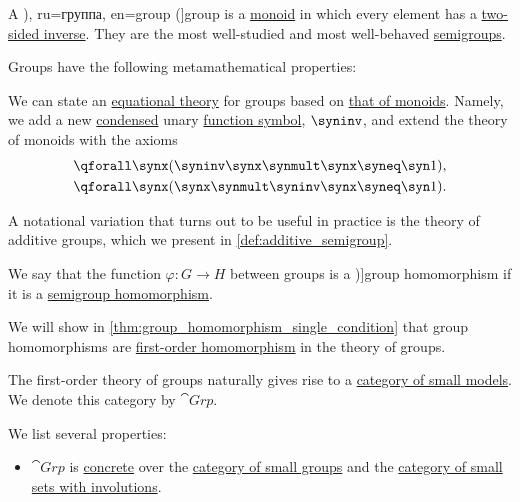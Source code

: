 \begin{definition}\label{def:group}
  A \term[bg=група (\cite[372]{Обрешков1962ВисшаАлгебра}), ru=группа, en=group (\cite[def. 1.2]{Jacobson1985BasicAlgebraI}]{group} is a \hyperref[def:monoid]{monoid} in which every element has a \hyperref[def:monoid_inverse]{two-sided inverse}. They are the most well-studied and most well-behaved \hyperref[def:semigroup]{semigroups}.

  Groups have the following metamathematical properties:
  \begin{thmenum}
     We can state an \hyperref[def:fol_equational_theory]{equational theory} for groups based on \hyperref[def:monoid/theory]{that of monoids}. Namely, we add a new \hyperref[def:fol_signature/notation]{condensed} unary \hyperref[def:fol_signature/function]{function symbol}, \( \syninv \), and extend the theory of monoids with the axioms
    \begin{align}
      \qforall \synx (\syninv \synx \synmult \synx &\syneq \syn1), \label{eq:def:group/theory/inverse/left} \\
      \qforall \synx (\synx \synmult \syninv \synx &\syneq \syn1). \label{eq:def:group/theory/inverse/right}
    \end{align}

    A notational variation that turns out to be useful in practice is the theory of additive groups, which we present in \cref{def:additive_semigroup}.

     We say that the function \( \varphi: G \to H \) between groups is a \term[ru=гомоморфизм (групп), en=homomorphism (of groups) (\cite[150]{Rotman2015AdvancedModernAlgebraPart1})]{group homomorphism} if it is a \hyperref[def:semigroup/morphism]{semigroup homomorphism}.

    We will show in \cref{thm:group_homomorphism_single_condition} that group homomorphisms are \hyperref[def:fol_homomorphism]{first-order homomorphism} in the theory of groups.

     The first-order theory of groups naturally gives rise to a \hyperref[def:fol_theory_model_functor/obj]{category of small models}. We denote this category by \( \cat{Grp} \).

    We list several properties:
    \begin{itemize}
      \item \( \cat{Grp} \) is \hyperref[def:concrete_category]{concrete} over the \hyperref[def:monoid/category]{category of small groups} and the \hyperref[def:set_with_involution/category]{category of small sets with involutions}.


\end{itemize}
\end{thmenum}
\end{definition}
